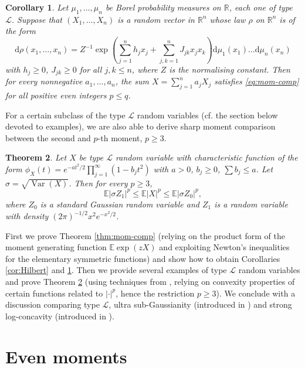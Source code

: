 \documentclass[10pt]{article}
\newcommand{\dd}{\mathrm{d}}
\newcommand{\E}{\mathbb{E}}
\newcommand{\1}{\textbf{1}}
\newcommand{\R}{\mathbb{R}}
\newcommand{\sL}{\mathscr{L}}
\DeclareMathOperator{\Var}{Var}
\newtheorem{theorem}{Theorem}
\newtheorem{corollary}[theorem]{Corollary}
\theoremstyle{remark}
\theoremstyle{definition}
\begin{document}
\begin{corollary}\label{cor:ferr}
Let $\mu_1, \ldots, \mu_n$ be Borel probability measures on $\R$, each one of type $\sL$. Suppose that $(X_1,\dots,X_n)$ is a random vector in $\R^n$ whose law $\rho$ on $\R^n$ is of the form
\begin{equation}\label{eq:ferr-density}
\dd\rho(x_1,\ldots,x_n) = Z^{-1}\exp\left(\sum_{j=1}^n h_jx_j+\sum_{j,k=1}^n J_{jk}x_jx_k\right)\dd\mu_1(x_1)\dots\dd\mu_n(x_n)
\end{equation}
with $h_j \geq 0$, $J_{jk} \geq 0$ for all $j,k \leq n$, where $Z$ is the normalising constant. Then for every nonnegative $a_1, \ldots, a_n$, the sum $X = \sum_{j=1}^n a_jX_j$ satisfies \eqref{eq:mom-comp} for all positive even integers $p \leq q$.
\end{corollary}


For a certain subclass of the type $\sL$ random variables (cf. the section below devoted to examples), we are also able to derive sharp moment comparison between the second and $p$-th moment, $p \geq 3$.

\begin{theorem}\label{thm:p>3}
Let $X$ be type $\sL$ random variable with characteristic function of the form $\phi_X(t) = e^{-a t^2/2}\prod_{j=1}^\infty(1-b_jt^2)$ with $a > 0$, $b_j \geq 0$, $\sum b_j \leq a$. Let $\sigma = \sqrt{\Var(X)}$. Then for every $p \geq 3$, 
\[
\E|\sigma Z_1|^p \leq \E|X|^p \leq \E|\sigma Z_0|^p,\]
where $Z_0$ is a standard Gaussian random variable and $Z_1$ is a random variable with density $(2\pi)^{-1/2}x^2e^{-x^2/2}$.
\end{theorem}


First we prove Theorem \ref{thm:mom-comp} (relying on the product form of the moment generating function $\E\exp(zX)$ and exploiting Newton's inequalities for the elementary symmetric functions) and show how to obtain Corollaries \ref{cor:Hilbert} and \ref{cor:ferr}. Then we provide several examples of type $\mathscr{L}$ random variables and prove Theorem \ref{thm:p>3} (using techniques from \cite{ENT2, NZ}, relying on convexity properties of certain functions related to $|\cdot|^p$, hence the restriction $p \geq 3$). We conclude with a discussion comparing type $\mathscr{L}$, ultra sub-Gaussianity (introduced in \cite{NO}) and strong log-concavity (introduced in \cite{Gur}).



\section{Even moments}
\end{document}
